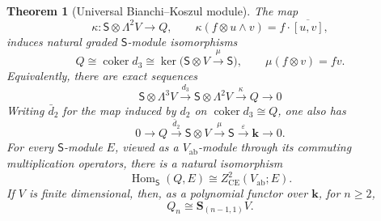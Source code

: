 \documentclass[10pt,reqno]{amsart}
\theoremstyle{plain}
\newtheorem{theorem}{Theorem}[section]
\theoremstyle{definition}
\theoremstyle{remark}
\begin{document}
\begin{theorem}[Universal Bianchi--Koszul module]
\label{cc:thm-bianchi-module}
The map
\[
 \kappa:\mathsf S\otimes\Lambda^2V\longrightarrow Q,
 \qquad
 \kappa(f\otimes u\wedge v)=f\cdot\overline{[u,v]},
\]
induces natural graded \(\mathsf S\)-module isomorphisms
\begin{equation}
 Q\cong\operatorname{coker}d_3
 \cong\ker\bigl(\mathsf S\otimes V\xrightarrow{\mu}\mathsf S\bigr),
 \qquad \mu(f\otimes v)=fv.
 \label{cc:eq-koszul-model}
\end{equation}
Equivalently, there are exact sequences
\begin{equation}
 \mathsf S\otimes\Lambda^3V\xrightarrow{d_3}
 \mathsf S\otimes\Lambda^2V\xrightarrow{\kappa}Q\longrightarrow0
 \label{cc:eq-bianchi-presentation}
\end{equation}
Writing \(\bar d_2\) for the map induced by \(d_2\) on
\(\operatorname{coker}d_3\cong Q\), one also has
\begin{equation}
 0\longrightarrow Q\xrightarrow{\bar d_2}\mathsf S\otimes V
 \xrightarrow{\mu}\mathsf S\xrightarrow{\varepsilon}\mathbf k
 \longrightarrow0.
 \label{cc:eq-first-syzygy}
\end{equation}
For every \(\mathsf S\)-module \(E\), viewed as a
\(V_{\mathrm{ab}}\)-module through its commuting multiplication
operators, there is a natural isomorphism
\begin{equation}
 {\operatorname{Hom}}_{\mathsf S}(Q,E)\cong Z^2_{\mathrm{CE}}(V_{\mathrm{ab}};E).
 \label{cc:eq-represents-cocycles}
\end{equation}
If \(V\) is finite dimensional, then, as a polynomial functor over
\(\mathbf k\), for \(n\geq2\),
\begin{equation}
 Q_n\cong\mathbf S_{(n-1,1)}V.
 \label{cc:eq-hook}
\end{equation}
\end{theorem}
\end{document}

